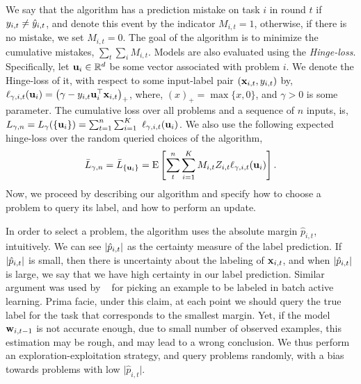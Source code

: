 We say that the algorithm has a prediction mistake on task $i$ in round $t$ if
$y_{i,t} \neq \hat{y}_{i,t}$, and denote this event by the indicator $M_{i,t}=1$,
otherwise, if there is no mistake, we set $M_{i,t}=0$. The goal of the
algorithm is to minimize the cumulative mistakes, $\sum_t \sum_i
M_{i,t}$. Models are also evaluated using the
{\em Hinge-loss}. Specifically, let $\mathbf{u}_{i}\in\mathbb{R}^d$ be some vector
associated with problem $i$. We denote the Hinge-loss  of it, with respect
to some input-label  pair $\left({\mathbf{x}_{i,t},y_{i,t}}\right)$ by,
$\ell_{\gamma,i,t}(\mathbf{u}_{i})= \left({\gamma-y_{i,t}
  {\mathbf{u}}^{\top}_{i}\mathbf{x}_{i,t}}\right)_{+}$, where, $(x)_+=\max\{x,0\}$, and $\gamma>0$ is
some parameter. The cumulative loss over all problems and a sequence of
$n$ inputs, is,
$ %
L_{\gamma,n} =L_{\gamma}(\{ \vui{i} \})=\sum_{t=1}^{n} \sum_{i=1}^{K}\ {\lossp{\gamma,i,t}(\vui{i})}
$. %
We also use the following expected hinge-loss over the random queried choices
of the algorithm, 
\begin{equation}
\bar{L}_{\gamma,n}=\bar{L}_{ \{ \mathbf{u}_{i}\}}
={\rm E}\left[{\sum_t^n \sum_{i=1}^{K}{M_{i,t}Z_{i,t}\ell_{\gamma,i,t}(\mathbf{u}_{i})}}\right]. 
 \end{equation}
Now, we proceed by  describing our algorithm     and specify how to choose a problem to query its label,
 and how to perform an update.



In order to select a problem, the algorithm uses the absolute margin
$\hat{p}_{i,t}$, intuitively. We can see $\left\vert{\hat{p}_{i,t}}\right\vert$ as the certainty measure of the label prediction.
 If $\left\vert{\hat{p}_{i,t}}\right\vert$ is small,
then there is uncertainty about the labeling of $\mathbf{x}_{i,t}$, and
when $\left\vert{\hat{p}_{i,t}}\right\vert$ is large, we say that we have high certainty in our label prediction. 
Similar argument was used by ~\cite{DBLP:conf/icml/TongK00} for picking an example to be labeled in 
batch active learning. Prima facie, under this claim, at each point we should query the true label for the task
 that corresponds to the smallest margin.  Yet, if the model $\mathbf{w}_{i,t-1}$ is not accurate enough, due to
 small number of observed examples, this estimation may be rough, and may lead to a wrong
conclusion. We thus perform an exploration-exploitation strategy, and
query problems randomly, with a bias towards problems with low 
$\vert \hat{p}_{i,t} \vert$. 

